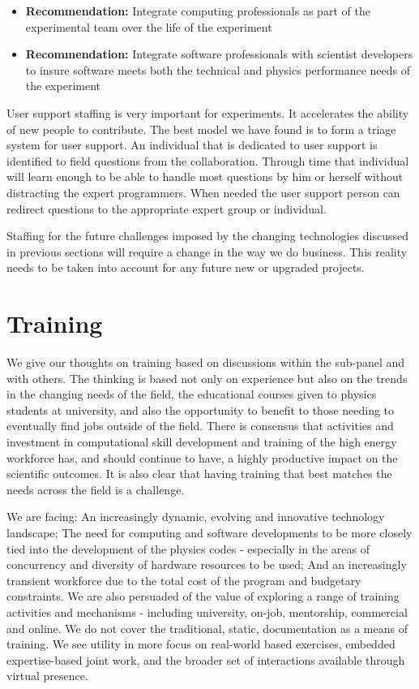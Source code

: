 \begin{itemize}
\item[] {\bf Recommendation:} Integrate computing professionals as part of the experimental team over the life of the experiment
\item[] {\bf Recommendation:} Integrate software professionals with scientist developers to insure software meets both the technical and physics performance needs of the experiment
\end{itemize}

User support staffing is very important for experiments.  It
accelerates the ability of new people to contribute.  The best model
we have found is to form a triage system for user support.  An
individual that is dedicated to user support is identified to field
questions from the collaboration.  Through time that individual
will learn enough to be able to handle most questions by him or
herself without distracting the expert programmers.  When needed
the user support person can redirect questions to the appropriate
expert group or individual.

Staffing for the future challenges imposed by the changing technologies
discussed in previous sections will require a change in the way we
do business.  This reality needs to be taken into account for any
future new or upgraded projects.


\section{Training}
\label{CpFI4:sec:training}

We give our thoughts on training  based on  discussions within the
sub-panel and with others. The thinking is based not only on
experience but also on the trends in the changing needs of the
field, the educational courses given to  physics students at
university, and also the opportunity to benefit to those needing
to eventually find jobs outside of the field. There is consensus
that activities and investment in computational skill development
and training of the high energy workforce has, and should continue
to have, a highly productive impact on the scientific outcomes. It
is also clear that having training that best matches the needs
across the field is a challenge.

We are facing: An increasingly dynamic, evolving and innovative
technology landscape; The need for  computing and software developments
to be more closely tied into the development of the physics codes
-  especially in the areas of concurrency and diversity of hardware
resources to be used;  And an increasingly transient workforce due
to the total cost of the program and  budgetary constraints.   We
are also persuaded of the value of exploring a range of training
activities and mechanisms - including university, on-job, mentorship,
commercial and online. We do not cover the traditional, static,
documentation as a means of training. We see utility in more focus
on real-world based exercises, embedded expertise-based joint work,
and the broader set of interactions available through virtual
presence.

